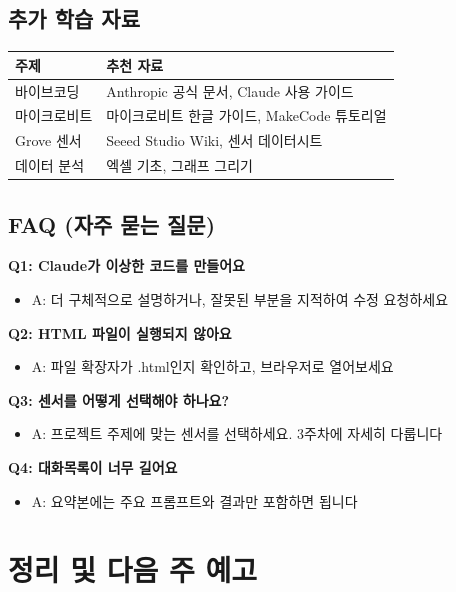\documentclass[11pt, a4paper]{article}
\begin{document}
\subsection{추가 학습 자료}

\begin{table}[H]
\centering
\begin{tabularx}{\textwidth}{|l|X|}
\hline
\rowcolor{lightgray}
\textbf{주제} & \textbf{추천 자료} \\
\hline
바이브코딩 & Anthropic 공식 문서, Claude 사용 가이드 \\
\hline
마이크로비트 & 마이크로비트 한글 가이드, MakeCode 튜토리얼 \\
\hline
Grove 센서 & Seeed Studio Wiki, 센서 데이터시트 \\
\hline
데이터 분석 & 엑셀 기초, 그래프 그리기 \\
\hline
\end{tabularx}
\end{table}

\subsection{FAQ (자주 묻는 질문)}

\textbf{Q1: Claude가 이상한 코드를 만들어요}
\begin{itemize}
  \item A: 더 구체적으로 설명하거나, 잘못된 부분을 지적하여 수정 요청하세요
\end{itemize}

\textbf{Q2: HTML 파일이 실행되지 않아요}
\begin{itemize}
  \item A: 파일 확장자가 .html인지 확인하고, 브라우저로 열어보세요
\end{itemize}

\textbf{Q3: 센서를 어떻게 선택해야 하나요?}
\begin{itemize}
  \item A: 프로젝트 주제에 맞는 센서를 선택하세요. 3주차에 자세히 다룹니다
\end{itemize}

\textbf{Q4: 대화목록이 너무 길어요}
\begin{itemize}
  \item A: 요약본에는 주요 프롬프트와 결과만 포함하면 됩니다
\end{itemize}

\newpage

\section{정리 및 다음 주 예고}
\end{document}
